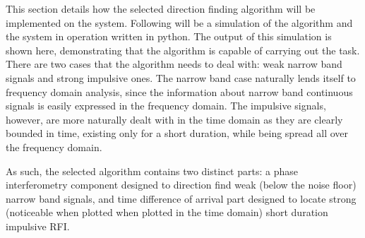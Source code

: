 This section details how the selected direction finding algorithm will be implemented on the system. Following will be a simulation of the algorithm and the system in operation written in python. The output of this simulation is shown here, demonstrating that the algorithm is capable of carrying out the task.\\

There are two cases that the algorithm needs to deal with: weak narrow band signals and strong impulsive ones. The narrow band case naturally lends itself to frequency domain analysis, since the information about narrow band continuous signals is easily expressed in the frequency domain. The impulsive signals, however, are more naturally dealt with in the time domain as they are clearly bounded in time, existing only for a short duration, while being spread all over the frequency domain. 

As such, the selected algorithm contains two distinct parts: a phase interferometry component designed to direction find weak (below the noise floor) narrow band signals, and time difference of arrival part designed to locate strong (noticeable when plotted when plotted in the time domain) short duration impulsive RFI.

